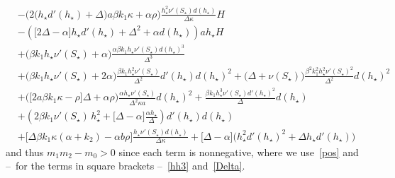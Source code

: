 \documentclass[reqno,11pt]{amsart}
\numberwithin{equation}{section}
\begin{document}
\begin{appendix}
\begin{align*}
&-  \Big(2\big(h_\star    d'(h_\star) +\Delta\big)
a  \beta k_1 \kappa +\alpha\rho\Big)\frac{h_\star^2\nu'(S_\star) d(h_\star) }{\Delta\kappa} H\\
& -\left(\big[2 \Delta-\alpha\big] h_\star d'(h_\star) + \Delta^{2} +\alpha  d(h_\star)\right) a h_\star H\\
& +\big(\beta  k_1 h_\star \nu'(S_\star) +\alpha\big)  \frac{ \alpha \beta k_1  h_\star   \nu'(S_\star) d(h_\star)^{3}}{\Delta^{3}} \\
&+\big(\beta k_1 h_\star  \nu'(S_\star)+2\alpha\big)\frac{\beta k_1 h_\star^{2}   \nu'(S_\star)}{\Delta^{2}} d'(h_\star)d(h_\star)^{2} +\big(\Delta+\nu(S_\star)\big)\frac{\beta^{2}k_1^{2} h_\star^{2}  \nu'(S_\star)^{2}}{\Delta^{2}}d(h_\star)^{2}\\
&+\Big(\big[2a\beta k_1\kappa-\rho\big]\Delta+\alpha \rho\Big)\frac{\alpha  h_\star\nu'(S_\star)}{\Delta^{2} \kappa a} d(h_\star)^{2}+\frac{\beta k_1   h_\star^{3}  \nu'(S_\star) d'(h_\star) ^{2}}{\Delta} d(h_\star)\\
&+\left(2 \beta k_1  \nu'(S_\star)  \,h_\star^{2}+\big[\Delta-\alpha\big]\frac{\alpha h_\star}{\Delta }\right) d'(h_\star)d(h_\star) \\
& +\Big[\Delta  \beta  k_1  \kappa(\alpha+k_2)-\alpha b \rho\Big]\frac{ h_\star  \nu'(S_\star) d(h_\star)}{\Delta \kappa} +\big[\Delta-\alpha\big] \Big(h_\star^{2}  d'(h_\star)^{2} +\Delta h_\star d'(h_\star)\Big)
\end{align*} 
and thus $m_1m_2-m_0>0$ since each term is nonnegative, where we use~\eqref{pos} and --~for the terms in square brackets --~\eqref{hh3} and~\eqref{Delta}.


\end{appendix}


 

\end{document}
